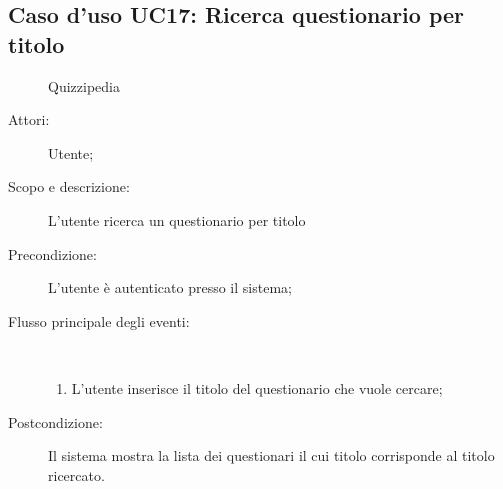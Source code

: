 \subsection{Caso d'uso UC17: Ricerca questionario per titolo}
	\begin{figure}[H]
		\centering
		\begin{resizedtikzpicture}{\textwidth}
		\begin{umlsystem}[x=0, fill=lightgray!20]{Quizzipedia}
		\end{umlsystem}
		\end{resizedtikzpicture}
		\caption{}
	\end{figure}
\begin{description}
\item[Attori:] Utente;
\item[Scopo e descrizione:] L'utente ricerca un questionario per titolo
      \item[Precondizione:] L'utente è autenticato presso il sistema;

        \item[Flusso principale degli eventi:] \ 
 \begin{enumerate}
          \item L'utente inserisce il titolo del questionario che vuole cercare;

      \end{enumerate}
    \item[Postcondizione:] Il sistema mostra la lista dei questionari il cui titolo corrisponde al titolo ricercato.
  \end{description}
\hypertarget{UC18}{}
